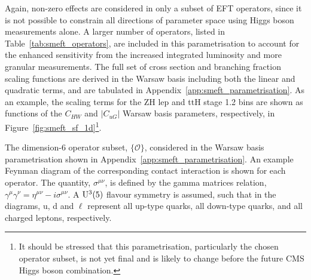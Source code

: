 Again, non-zero effects are considered in only a subset of EFT operators, since it is not possible to constrain all directions of parameter space using Higgs boson measurements alone. A larger number of operators, listed in Table~\ref{tab:smeft_operators}, are included in this parametrisation to account for the enhanced sensitivity from the increased integrated luminosity and more granular measurements. The full set of cross section and branching fraction scaling functions are derived in the Warsaw basis including both the linear and quadratic terms, and are tabulated in Appendix~\ref{app:smeft_parametrisation}. As an example, the scaling terms for the ZH lep and ttH stage 1.2 bins are shown as functions of the $C_{HW}$ and $|C_{uG}|$ Warsaw basis parameters, respectively, in Figure~\ref{fig:smeft_sf_1d}\footnote{It should be stressed that this parametrisation, particularly the chosen operator subset, is not yet final and is likely to change before the future CMS Higgs boson combination.}.

\begin{table}[htb!]
  \centering
  \scriptsize
  \renewcommand{\arraystretch}{2.3}
  \setlength{\tabcolsep}{3pt}
  \caption[Operator subset in the Warsaw basis parametrisation]
  {
    The dimension-6 operator subset, $\{\mathcal{O}\}$, considered in the Warsaw basis parametrisation shown in Appendix~\ref{app:smeft_parametrisation}. An example Feynman diagram of the corresponding contact interaction is shown for each operator. The quantity, $\sigma^{\mu\nu}$, is defined by the gamma matrices relation, $\gamma^{\mu}\gamma^{\nu}=\eta^{\mu\nu}-i\sigma^{\mu\nu}$. A ${\rm{U}^3(5)}$ flavour symmetry is assumed, such that in the diagrams, u, d and $\ell$ represent all up-type quarks, all down-type quarks, and all charged leptons, respectively.
  }
  \label{tab:smeft_operators}
  
\end{table}

